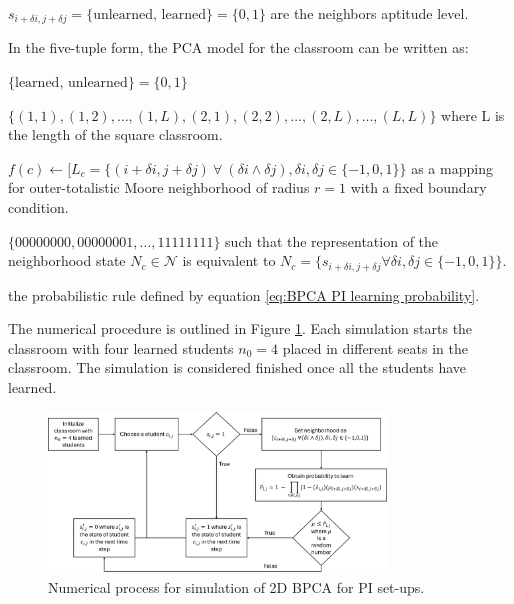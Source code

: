 $s_{i+\delta i, j+\delta j} = \lbrace\text{unlearned, learned}\rbrace=\lbrace 0,1 \rbrace$ are the neighbors aptitude level.

\newpage
In the five-tuple form, the PCA model for the classroom can be written as:

\begin{CAdef}
\itemS $\lbrace \text{learned, unlearned} \rbrace = \lbrace 0, 1 \rbrace$

\itemC $\lbrace (1,1), (1,2), \dots, (1,L), (2, 1), (2,2), \dots, (2,L), \dots, (L,L)\rbrace$ where L is the length of the square classroom.

\itemL $f(c) \leftarrow \lbrack L_c = \lbrace (i+\delta i,j+\delta j) ~\forall~ (\delta i \land \delta j),  \delta i, \delta j \in \lbrace -1,0,1 \rbrace \rbrace $ as a mapping for outer-totalistic Moore neighborhood of radius $r=1$ with a fixed boundary condition.

\itemN $\lbrace 00000000, 00000001, \dots, 11111111 \rbrace$ such that the representation of the neighborhood state $N_c \in \mathcal{N}$ is equivalent to $N_c = \lbrace s_{i+\delta i, j+\delta j} \forall \delta i, \delta j \in \lbrace -1,0,1 \rbrace \rbrace$.

\itemR the probabilistic rule defined by equation \ref{eq:BPCA PI learning probability}.
\end{CAdef}

The numerical procedure is outlined in Figure \ref{fig:2DBPCA PI Flowchart}. Each simulation starts the classroom with four learned students $n_0 = 4$ placed in different seats in the classroom. The simulation is considered finished once all the students have learned.

\begin{figure}[h!]
    \centering
    \includegraphics[width=0.8\textwidth]{figures/2DBPCA PI Flowchart.png}
    \caption[Peer instruction flowchart]{Numerical process for simulation of 2D BPCA for PI set-ups.}
    \label{fig:2DBPCA PI Flowchart}
\end{figure}


